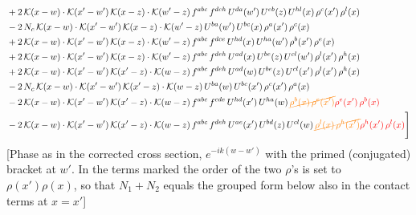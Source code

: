 \documentclass[9pt]{article}
\numberwithin{equation}{section}
\begin{document}
\begin{align}
&+2\,\mathcal{K}(x-w)\cdot\mathcal{K}(x'-w')\,\mathcal{K}(x-z)\cdot\mathcal{K}(w'-z)\,f^{abc}\,f^{deh}\,U^{da}(w')\,U^{eb}(z)\,U^{hl}(x)\,\rho^{c}(x')\,\rho^{l}(x)\notag\\
&-2\,N_{c}\,\mathcal{K}(x-w)\cdot\mathcal{K}(x'-w')\,\mathcal{K}(x-z)\cdot\mathcal{K}(w'-z)\,U^{ba}(w')\,U^{bc}(x)\,\rho^{a}(x')\,\rho^{c}(x)\notag\\
&+2\,\mathcal{K}(x-w)\cdot\mathcal{K}(x'-w')\,\mathcal{K}(x-z)\cdot\mathcal{K}(w'-z)\,f^{abc}\,f^{dce}\,U^{hd}(x)\,U^{ha}(w')\,\rho^{b}(x')\,\rho^{e}(x)\notag\\
&+2\,\mathcal{K}(x-w)\cdot\mathcal{K}(x'-w')\,\mathcal{K}(x-z)\cdot\mathcal{K}(w'-z)\,f^{abc}\,f^{deh}\,U^{ad}(x)\,U^{be}(z)\,U^{cl}(w')\,\rho^{l}(x')\,\rho^{h}(x)\notag\\
&+2\,\mathcal{K}(x-w)\cdot\mathcal{K}(x'-w')\,\mathcal{K}(x'-z)\cdot\mathcal{K}(w-z)\,f^{abc}\,f^{deh}\,U^{ad}(w)\,U^{be}(z)\,U^{cl}(x')\,\rho^{l}(x')\,\rho^{h}(x)\notag\\
&-2\,N_{c}\,\mathcal{K}(x-w)\cdot\mathcal{K}(x'-w')\,\mathcal{K}(x'-z)\cdot\mathcal{K}(w-z)\,U^{ba}(w)\,U^{bc}(x')\,\rho^{c}(x')\,\rho^{a}(x)\notag\\
&-2\,\mathcal{K}(x-w)\cdot\mathcal{K}(x'-w')\,\mathcal{K}(x'-z)\cdot\mathcal{K}(w-z)\,f^{abc}\,f^{cde}\,U^{hd}(x')\,U^{ha}(w)\,{\color{orange}\cancel{\rho^{b}(x)\,\rho^{e}(x')}}{\color{red}\rho^{e}(x')\,\rho^{b}(x)}\notag\\
&-2\,\mathcal{K}(x-w)\cdot\mathcal{K}(x'-w')\,\mathcal{K}(x'-z)\cdot\mathcal{K}(w-z)\,f^{abc}\,f^{deh}\,U^{ae}(x')\,U^{bd}(z)\,U^{cl}(w)\,{\color{orange}\cancel{\rho^{l}(x)\,\rho^{h}(x')}}{\color{red}\rho^{h}(x')\,\rho^{l}(x)}\Bigg]
\end{align} {\color{red}[Phase as in the corrected cross section, $e^{-ik(w-w')}$ with the primed (conjugated) bracket at $w'$. In the terms marked the order of the two $\rho$'s is set to $\rho(x')\rho(x)$, so that $N_{1}+N_{2}$ equals the grouped form below also in the contact terms at $x=x'$]}\par\noindent 
\end{document}
